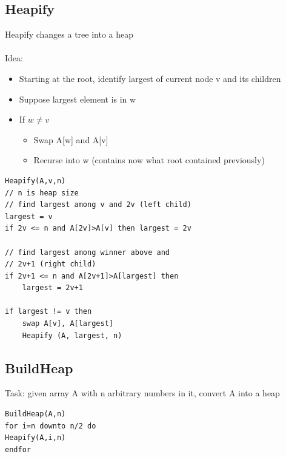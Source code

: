 \documentclass{article}[18pt]
\begin{document}
\subsection{Heapify}
Heapify changes a tree into a heap\\
\\
Idea:
\begin{itemize}
	\item Starting at the root, identify largest of current node v and its children
	\item Suppose largest element is in w
	\item If $w\neq v$
	\begin{itemize}
		\item Swap A[w] and A[v]
		\item Recurse into w (contains now what root contained previously)
	\end{itemize}
\end{itemize}
\begin{lstlisting}
Heapify(A,v,n)
// n is heap size
// find largest among v and 2v (left child)
largest = v
if 2v <= n and A[2v]>A[v] then largest = 2v

// find largest among winner above and
// 2v+1 (right child)
if 2v+1 <= n and A[2v+1]>A[largest] then
	largest = 2v+1
	
if largest != v then
	swap A[v], A[largest]
	Heapify (A, largest, n)
\end{lstlisting}
\subsection{BuildHeap}
Task: given array A with n arbitrary numbers in it, convert A into a heap
\begin{lstlisting}
BuildHeap(A,n)
for i=n downto n/2 do
Heapify(A,i,n)
endfor
\end{lstlisting}
\end{document}
